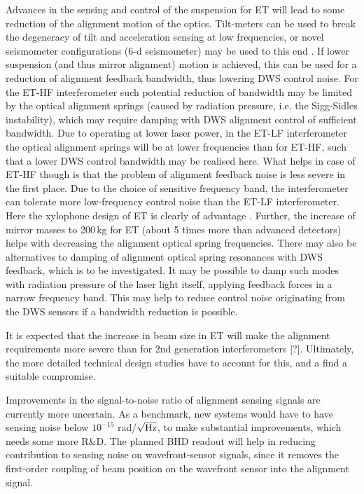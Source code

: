 Advances in the sensing and control of the suspension for ET will lead to some reduction of the alignment motion of the optics. Tilt-meters can be used to break the degeneracy of tilt and acceleration sensing at low frequencies, or novel seismometer configurations (6-d seismometer) may be used to this end \cite{MLMa2018,YuHM2018}. 
If lower suspension (and thus mirror alignment) motion is achieved, this can be used for a reduction of alignment feedback bandwidth, thus lowering DWS control noise.
For the ET-HF interferometer such potential reduction of bandwidth may be limited by
the optical alignment springs (caused by radiation pressure, i.e. the Sigg-Sidles instability),
which may require damping with DWS alignment control of sufficient bandwidth.
Due to operating at lower laser power, in the ET-LF interferometer the optical alignment springs will be at lower frequencies than for ET-HF, such that a lower DWS control bandwidth may be realised here.
What helps in case of ET-HF though is that the problem of alignment feedback noise is less severe in the first place. Due to the choice of sensitive frequency band, the interferometer can tolerate more low-frequency control noise than the ET-LF interferometer. Here the xylophone design of ET is clearly of advantage \cite{Hild2010a}.
Further, the increase of mirror masses to 200\,kg for ET (about 5 times more than advanced detectors)  
helps with decreasing the alignment optical spring frequencies.
There may also be alternatives to damping of alignment optical spring resonances with DWS feedback,
which is to be investigated. It may be possible to damp such modes with radiation pressure of the laser light itself, applying feedback forces in a narrow frequency band. This may help to reduce control
noise originating from the DWS sensors if a bandwidth reduction is possible.

It is expected that the increase in beam size in ET will make the alignment requirements more severe
than for 2nd generation interferometers [?].
Ultimately, the more detailed technical design studies have to account for this, and a find a suitable
compromise.

Improvements in the signal-to-noise ratio of alignment sensing signals are currently more uncertain.
As a benchmark, new systems would have to have sensing noise below $10^{-15}$ rad/$\sqrt{\rm Hz}$,
to make substantial improvements, which needs some more R\&D.
The planned BHD readout will help in reducing contribution to sensing noise on wavefront-sensor signals, since it removes the first-order coupling of beam position on the wavefront sensor into the alignment signal.

